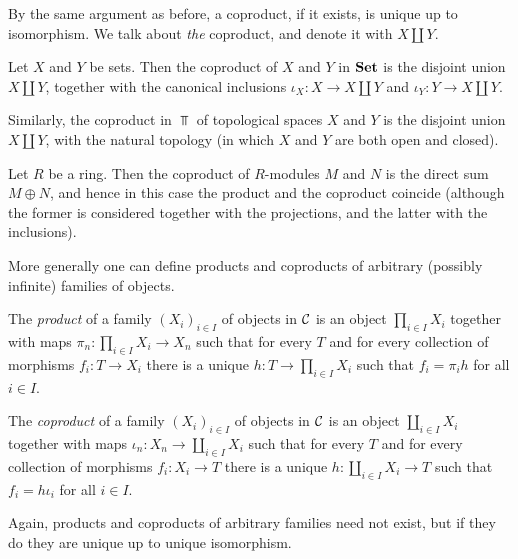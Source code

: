 By the same argument as before, a coproduct, if it exists, is unique up to isomorphism. We talk about \emph{the} coproduct, and denote it with $X\amalg Y$.

\begin{example}Let $X$ and $Y$ be sets. Then the coproduct of $X$ and $Y$ in $\mathbf{Set}$ is the disjoint union $X\amalg Y$, together with the canonical inclusions $\iota_X \colon X\to X \amalg Y$ and $\iota_Y\colon Y \to X \amalg Y$. 

Similarly, the coproduct in $\Top$ of topological spaces $X$ and $Y$ is the disjoint union $X \amalg Y$, with the natural topology (in which $X$ and $Y$ are both open and closed).
\end{example}

\begin{example}
Let $R$ be a ring. Then the coproduct of $R$-modules $M$ and $N$ is the direct sum $M\oplus N$, and hence in this case the  product and the coproduct coincide (although the former is considered together with the projections, and the latter with the inclusions). 
\end{example}

More generally one can define products and coproducts of arbitrary (possibly infinite) families of objects.

\begin{definition}
The \emph{product} of a family $(X_i)_{i\in I}$  of objects in ${\mathcal{C}}$ is an object $\prod_{i\in I} X_i$ together with maps $\pi_n \colon \prod_{i\in I} X_i \to X_n$ such that for every $T$ and for every collection of morphisms $f_i \colon T\to X_i$ there is a unique $h\colon T\to \prod_{i\in I} X_i$ such that $f_i = \pi_ih$ for all $i\in I$.
\end{definition}

\begin{definition}
The \emph{coproduct} of a family $(X_i)_{i\in I}$  of objects in ${\mathcal{C}}$ is an object $\coprod_{i\in I} X_i$ together with maps $\iota_n \colon X_n\to \coprod_{i\in I} X_i$ such that for every $T$ and for every collection of morphisms $f_i \colon X_i\to T$ there is a unique $h\colon \coprod_{i\in I} X_i \to T$ such that $f_i = h\iota_i$ for all $i\in I$.
\end{definition}

Again, products and coproducts of arbitrary families need not exist, but if they do they are unique up to unique isomorphism.

